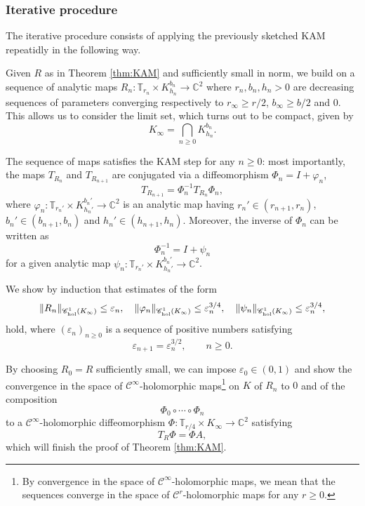 \documentclass[10pt]{article}
\newcommand{\C}{\mathbb{C}}
\newcommand{\T}{\mathbb{T}}
\begin{document}
\subsubsection*{Iterative procedure}

The iterative procedure consists of applying the previously sketched KAM repeatidly in the following way. 

Given $R$ as in Theorem \ref{thm:KAM} and sufficiently small in norm, we build on a sequence of analytic maps $R_n:\T_{r_n}\times K_{h_n}^{b_n}\to\C^2$ where $r_n,b_n,h_n>0$ are decreasing sequences of parameters converging respectively to $r_\infty\geq r/2$, $b_\infty\geq b/2$ and $0$. This allows us to consider the limit set, which turns out to be compact, given by 
\[
K_{\infty} = \bigcap_{n\geq 0} K_{h_n}^{b_n}.
\]


The sequence of maps satisfies the KAM step for any $n\geq 0$: most importantly, the maps $T_{R_n}$ and $T_{R_{n+1}}$ are conjugated via a diffeomorphism $\Phi_n = I+\varphi_n$,
\[
T_{R_{n+1}} = \Phi_n^{-1} T_{R_n} \Phi_n,
\]
where $\varphi_n:\T_{r_n'}\times K_{h_n'}^{b_n'}\to\C^2$ is an analytic map having  $r_n'\in(r_{n+1},r_n)$, $b_n'\in(b_{n+1},b_n)$ and $h_n'\in(h_{n+1},h_n)$. Moreover, the inverse of $\Phi_n$ can be written as
\[
\Phi_n^{-1} = I+\psi_n
\]
for a given analytic map $\psi_n:\T_{r_n'}\times K_{h_n'}^{b_n'}\to\C^2$.

We show by induction that estimates of the form
\[
\|R_n\|_{\mathscr{C}^1_{\textup{hol}}(K_\infty)} \leq \varepsilon_n,
\quad
\|\varphi_n\|_{\mathscr{C}^1_{\textup{hol}}(K_\infty)}\leq \varepsilon_n^{3/4},
\quad
\|\psi_n\|_{\mathscr{C}^1_{\textup{hol}}(K_\infty)}\leq \varepsilon_n^{3/4},
\]
hold, where $(\varepsilon_n)_{n\geq 0}$ is a sequence of positive numbers satisfying
\[
\varepsilon_{n+1}=\varepsilon_n^{3/2}, \qquad n\geq 0.
\]

By choosing $R_0=R$ sufficiently small, we can impose $\varepsilon_0\in(0,1)$ and show the convergence in the space of $\mathscr C^{\infty}$-holomorphic maps\footnote{By convergence in the space of $\mathscr C^{\infty}$-holomorphic maps, we mean that the sequences converge in the space of $\mathscr C^{r}$-holomorphic maps for any $r\geq 0$.} on $K$ of $R_n$ to $0$
and of the composition 
\[
\Phi_0\circ\cdots\circ\Phi_n
\]
to a $\mathscr C^{\infty}$-holomorphic diffeomorphism $\Phi:\T_{r/4}\times K_{\infty}\to\C^2$ satisfying
\[
T_R\Phi = \Phi A,
\]
which will finish the proof of Theorem \ref{thm:KAM}.

\vspace{0.3cm}
\end{document}
